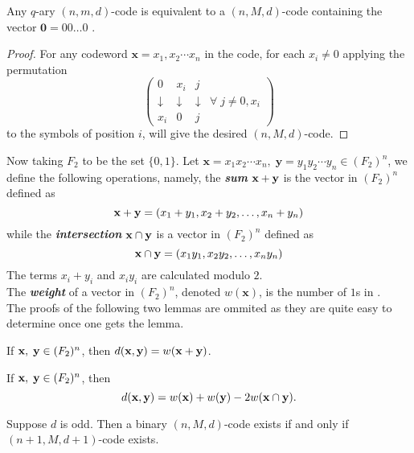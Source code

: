 \documentclass[../main.tex]{subfiles}
\begin{document}
\begin{lem}
	Any $q$-ary $(n,m,d)$-code is equivalent to a $(n,M,d)$-code containing the vector $\textbf{0}=00\ldots 0$ .
\end{lem}

\begin{proof}
	For any codeword $\textbf{x}=x_1,x_2\cdots x_n$ in the code, for each $x_i\neq 0$ applying the permutation
	\[
		\begin{pmatrix}
			0 & x_i  & j \\
			\downarrow & \downarrow & \downarrow & \forall\; j \neq 0,x_i \\
			x_i & 0 & j
		\end{pmatrix}
	\]
	to the symbols of position $i$, will give the desired $(n,M,d)$-code.
\end{proof}

Now taking $F_2$ to be the set $\{0,1\}$. Let $\textbf{x} = x_1x_2\cdots x_n,\; \textbf{y} = y_1y_2\cdots y_n \in (F_2)^n$, we define the following operations, namely,
the \textbf{\emph{sum}} $\textbf{x} + \textbf{y}$ is the vector in $(F_2)^n$ defined as
\[
	\textbf{x} + \textbf{y} = (x_1+y_1,x_2+y_2,\ldots,x_n+y_n)
\]
while the \textbf{\emph{intersection}} $\textbf{x} \cap \textbf{y}$ is a vector in $(F_2)^n$ defined as
\[
	\textbf{x} \cap \textbf{y} = (x_1y_1,x_2y_2,\ldots,x_ny_n)  
\]
The terms $x_i+y_i$ and $x_iy_i$ are calculated modulo $2$.\\
The \textbf{\emph{weight}} of a vector  in $(F_2)^n$, denoted $w(\textbf{x})$, is the number of $1$s in .\\

The proofs of the following two lemmas are ommited as they are quite easy to determine once one gets the lemma.

\begin{lem}
	If $\textbf{x},\; \textbf{y} \in (F_2)^n$, then $d(\textbf{x},\textbf{y})=w(\textbf{x}+\textbf{y})$. 
\end{lem}

\begin{lem}\label{dis-weight}
	If $\textbf{x},\; \textbf{y} \in (F_2)^n$, then 
	\[
		d(\textbf{x},\textbf{y}) = w(\textbf{x}) + w(\textbf{y}) - 2w(\textbf{x} \cap \textbf{y}).
	\] 
\end{lem}

\begin{thm}\label{parity_property}
	Suppose $d$ is odd. Then a binary $(n,M,d)$-code exists	if and only if $(n+1,M,d+1)$-code exists.
\end{thm}
\end{document}
